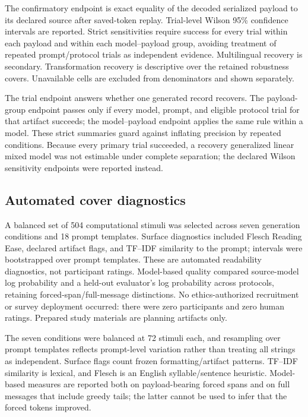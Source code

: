 \documentclass[fleqn,10pt]{wlscirep}
\begin{document}
The confirmatory endpoint is exact equality of the decoded serialized payload to its declared source after saved-token replay. Trial-level Wilson 95\% confidence intervals are reported\cite{Wilson1927Interval}. Strict sensitivities require success for every trial within each payload and within each model--payload group, avoiding treatment of repeated prompt/protocol trials as independent evidence. Multilingual recovery is secondary. Transformation recovery is descriptive over the retained robustness covers. Unavailable cells are excluded from denominators and shown separately.

The trial endpoint answers whether one generated record recovers. The payload-group endpoint passes only if every model, prompt, and eligible protocol trial for that artifact succeeds; the model--payload endpoint applies the same rule within a model. These strict summaries guard against inflating precision by repeated conditions. Because every primary trial succeeded, a recovery generalized linear mixed model was not estimable under complete separation; the declared Wilson sensitivity endpoints were reported instead.

\subsection*{Automated cover diagnostics}\label{sec:quality-method}

A balanced set of 504 computational stimuli was selected across seven generation conditions and 18 prompt templates. Surface diagnostics included Flesch Reading Ease\cite{Flesch1948Readability}, declared artifact flags, and TF--IDF similarity to the prompt; intervals were bootstrapped over prompt templates. These are automated readability diagnostics, not participant ratings. Model-based quality compared source-model log probability and a held-out evaluator's log probability across protocols, retaining forced-span/full-message distinctions. No ethics-authorized recruitment or survey deployment occurred: there were zero participants and zero human ratings. Prepared study materials are planning artifacts only.

The seven conditions were balanced at 72 stimuli each, and resampling over prompt templates reflects prompt-level variation rather than treating all strings as independent. Surface flags count frozen formatting/artifact patterns. TF--IDF similarity is lexical, and Flesch is an English syllable/sentence heuristic. Model-based measures are reported both on payload-bearing forced spans and on full messages that include greedy tails; the latter cannot be used to infer that the forced tokens improved.
\end{document}
